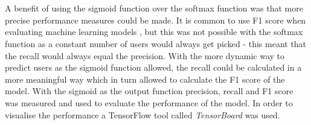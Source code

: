 \\\\
A benefit of using the sigmoid function over the softmax function was that more precise performance measures could be made. It is common to use F1 score when evaluating machine learning models \parencite{yang1999re}, but this was not possible with the softmax function as a constant number of users would always get picked - this meant that the recall would always equal the precision. With the more dynamic way to predict users as the sigmoid function allowed, the recall could be calculated in a more meaningful way which in turn allowed to calculate the F1 score of the model. With the sigmoid as the output function precision, recall and F1 score was measured and used to evaluate the performance of the model. In order to visualise the performance a TensorFlow tool called \textit{TensorBoard} was used.
